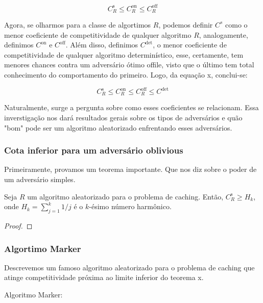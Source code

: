 \documentclass[a4paper,oneside,reqno,12pt]{amsart}
\begin{document}
\begin{equation}
  C_R^{\text{s}} \leqslant C_R^{\text{on}} \leqslant C_R^{\text{off}}
\end{equation}

Agora, se olharmos para a classe de algortimos \(R\), podemos definir \(C^{s}\) como o menor coeficiente de competitividade de qualquer algoritmo \(R\), analogamente, definimos \(C^\text{{on}}\) e \(C^\text{{off}}\). Além disso, definimos \(C^{\text{det}}\), o menor coeficiente de competitividade de qualquer algoritmo determinístico, esse, certamente, tem menores chances contra um adversário ótimo offile, visto que o último tem total conhecimento do comportamento do primeiro. Logo, da equação x, conclui-se:

\begin{equation}
  C_R^{\text{s}} \leqslant C_R^{\text{on}} \leqslant C_R^{\text{off}} \leqslant C^{\text{det}}
\end{equation}

Naturalmente, surge a pergunta sobre como esses coeficientes se relacionam. Essa inverstigação nos dará resultados gerais sobre os tipos de adversários e quão "bom" pode ser um algoritmo aleatorizado enfrentando esses adversários.


\subsubsection{Cota inferior para um adversário oblivious}

Primeiramente, provamos um teorema importante. Que nos diz sobre o poder de um adversário simples.

\begin{theorem}
  Seja \(R\) um algoritmo aleatorizado para o problema de caching. Então, \(C_R^{\text{s}} \geqslant H_k\), onde \(H_k = \sum_{j = 1}^{k} 1/j\) é o \(k\)-ésimo número harmônico.
  \begin{proof}
  \end{proof}
\end{theorem}


\subsubsection{Algortimo Marker}

Descrevemos um famoso algoritmo aleatorizado para o problema de caching que atinge competitividade próxima ao limite inferior do teorema x.

Algoritmo Marker: 
\end{document}
